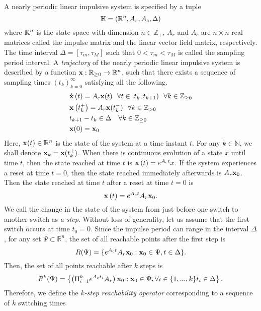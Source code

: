 A nearly periodic linear impulsive system is specified by a tuple
%
\[\mathbb{H}=\left(\mathbb{R}^n,A_r,A_c,\Delta\right)\] where $\mathbb{R}^n$ is the state
space with dimension $n\in\mathbb{Z}_+$, $A_r$ and $A_c$ are $n\times
n$ real matrices called the impulse matrix and the linear vector field
matrix, respectively.  The time interval $\Delta=[\tau_m,\tau_M]$ such
that $0<\tau_m<\tau_M$ is called the sampling period interval.  A
\emph{trajectory} of the nearly periodic linear impulsive system is
described by a function $\textbf{x}:\mathbb{R}_{\geq 0}\rightarrow
\mathbb{R}^n$, such that there exists a sequence of sampling times
$(t_k)_{k=0}^\infty$ satisfying all the following.
%
\begin{equation}\label{eqn:system} \begin{split}
&{{\bf \dot{x}}\left(t\right)}=A_c\textbf{x}(t)~~\forall t\in [t_k,t_{k+1})~~\forall k\in\mathbb{Z}_{\geq 0}\\
&{\bf x}\left(t_k^+\right)=A_r\textbf{x}(t_k^-)~~\forall k\in\mathbb{Z}_{>0}\\ 
&t_{k+1}-t_k\in\Delta~~~\forall k\in\mathbb{Z}_{\geq 0}\\
&\textbf{x}(0)=\textbf{x}_0
\end{split} \end{equation}
%
Here, $\textbf{x}(t)\in\mathbb{R}^n$ is the state of the system at a time
instant $t$.  For any $k\in\mathbb{N}$, we shall denote
$\textbf{x}_k=\textbf{x}(t_k^+)$.  When there is continuous evolution of a
state $x$ until time $t$, then the state reached at time $t$ is
${\bf x}\left(t\right)=e^{A_ct}x$.  If the system experiences a reset at time
$t=0$, then the state reached immediately afterwards is
$A_r\textbf{x}_0$.  Then the state reached at time $t$ after a reset at
time $t=0$ is
%
\[
{\bf x}\left(t\right)=e^{A_ct}A_r\textbf{x}_0.
\]
%
We call the change in the state of the system from just before one
switch to another switch as \emph{a step}.  Without loss of
generality, let us assume that the first switch occurs at time
$t_0=0$.  Since the impulse period can range in the interval $\Delta$,
for any set $\Psi\subset \mathbb{R}^n$, the set of all reachable
points after the first step is
        \[ R(\Psi)=\{e^{A_ct}A_r \textbf{x}_0:
        \textbf{x}_0 \in \Psi, t\in\Delta\}.
        \]
Then, the set of all points
        reachable after $k$ steps is
%
\begin{equation*}%
R^k(\Psi)=\left\{\left(\Pi_{i=1}^ke^{A_ct_i}A_r\right)\initstate: \initstate\in
\Psi, \forall i\in\{1,...,k\} t_i\in\Delta\right\}. 
\end{equation*}
%
Therefore, we define the {\em
$k$-step reachability operator} corresponding to a sequence of $k$ switching times

